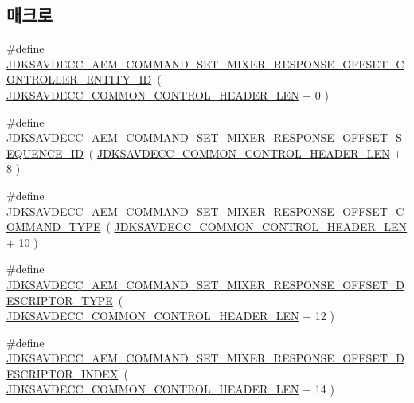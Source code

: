 \subsection*{매크로}
\begin{DoxyCompactItemize}
\item 
\#define \hyperlink{group__command__set__mixer__response_ga656109ba3ba5bd4bf68cc4490ee3a497}{J\+D\+K\+S\+A\+V\+D\+E\+C\+C\+\_\+\+A\+E\+M\+\_\+\+C\+O\+M\+M\+A\+N\+D\+\_\+\+S\+E\+T\+\_\+\+M\+I\+X\+E\+R\+\_\+\+R\+E\+S\+P\+O\+N\+S\+E\+\_\+\+O\+F\+F\+S\+E\+T\+\_\+\+C\+O\+N\+T\+R\+O\+L\+L\+E\+R\+\_\+\+E\+N\+T\+I\+T\+Y\+\_\+\+ID}~( \hyperlink{group__jdksavdecc__avtp__common__control__header_gaae84052886fb1bb42f3bc5f85b741dff}{J\+D\+K\+S\+A\+V\+D\+E\+C\+C\+\_\+\+C\+O\+M\+M\+O\+N\+\_\+\+C\+O\+N\+T\+R\+O\+L\+\_\+\+H\+E\+A\+D\+E\+R\+\_\+\+L\+EN} + 0 )
\item 
\#define \hyperlink{group__command__set__mixer__response_ga5bf30e999b5928c2251851a5d079fd9c}{J\+D\+K\+S\+A\+V\+D\+E\+C\+C\+\_\+\+A\+E\+M\+\_\+\+C\+O\+M\+M\+A\+N\+D\+\_\+\+S\+E\+T\+\_\+\+M\+I\+X\+E\+R\+\_\+\+R\+E\+S\+P\+O\+N\+S\+E\+\_\+\+O\+F\+F\+S\+E\+T\+\_\+\+S\+E\+Q\+U\+E\+N\+C\+E\+\_\+\+ID}~( \hyperlink{group__jdksavdecc__avtp__common__control__header_gaae84052886fb1bb42f3bc5f85b741dff}{J\+D\+K\+S\+A\+V\+D\+E\+C\+C\+\_\+\+C\+O\+M\+M\+O\+N\+\_\+\+C\+O\+N\+T\+R\+O\+L\+\_\+\+H\+E\+A\+D\+E\+R\+\_\+\+L\+EN} + 8 )
\item 
\#define \hyperlink{group__command__set__mixer__response_ga067d468b0e600c9a1f6cff8b0891075b}{J\+D\+K\+S\+A\+V\+D\+E\+C\+C\+\_\+\+A\+E\+M\+\_\+\+C\+O\+M\+M\+A\+N\+D\+\_\+\+S\+E\+T\+\_\+\+M\+I\+X\+E\+R\+\_\+\+R\+E\+S\+P\+O\+N\+S\+E\+\_\+\+O\+F\+F\+S\+E\+T\+\_\+\+C\+O\+M\+M\+A\+N\+D\+\_\+\+T\+Y\+PE}~( \hyperlink{group__jdksavdecc__avtp__common__control__header_gaae84052886fb1bb42f3bc5f85b741dff}{J\+D\+K\+S\+A\+V\+D\+E\+C\+C\+\_\+\+C\+O\+M\+M\+O\+N\+\_\+\+C\+O\+N\+T\+R\+O\+L\+\_\+\+H\+E\+A\+D\+E\+R\+\_\+\+L\+EN} + 10 )
\item 
\#define \hyperlink{group__command__set__mixer__response_ga2a1ce9786da431666e786485a051c4c3}{J\+D\+K\+S\+A\+V\+D\+E\+C\+C\+\_\+\+A\+E\+M\+\_\+\+C\+O\+M\+M\+A\+N\+D\+\_\+\+S\+E\+T\+\_\+\+M\+I\+X\+E\+R\+\_\+\+R\+E\+S\+P\+O\+N\+S\+E\+\_\+\+O\+F\+F\+S\+E\+T\+\_\+\+D\+E\+S\+C\+R\+I\+P\+T\+O\+R\+\_\+\+T\+Y\+PE}~( \hyperlink{group__jdksavdecc__avtp__common__control__header_gaae84052886fb1bb42f3bc5f85b741dff}{J\+D\+K\+S\+A\+V\+D\+E\+C\+C\+\_\+\+C\+O\+M\+M\+O\+N\+\_\+\+C\+O\+N\+T\+R\+O\+L\+\_\+\+H\+E\+A\+D\+E\+R\+\_\+\+L\+EN} + 12 )
\item 
\#define \hyperlink{group__command__set__mixer__response_ga3f9fa36616757c3063295c00f5facf06}{J\+D\+K\+S\+A\+V\+D\+E\+C\+C\+\_\+\+A\+E\+M\+\_\+\+C\+O\+M\+M\+A\+N\+D\+\_\+\+S\+E\+T\+\_\+\+M\+I\+X\+E\+R\+\_\+\+R\+E\+S\+P\+O\+N\+S\+E\+\_\+\+O\+F\+F\+S\+E\+T\+\_\+\+D\+E\+S\+C\+R\+I\+P\+T\+O\+R\+\_\+\+I\+N\+D\+EX}~( \hyperlink{group__jdksavdecc__avtp__common__control__header_gaae84052886fb1bb42f3bc5f85b741dff}{J\+D\+K\+S\+A\+V\+D\+E\+C\+C\+\_\+\+C\+O\+M\+M\+O\+N\+\_\+\+C\+O\+N\+T\+R\+O\+L\+\_\+\+H\+E\+A\+D\+E\+R\+\_\+\+L\+EN} + 14 )

\end{DoxyCompactItemize}
